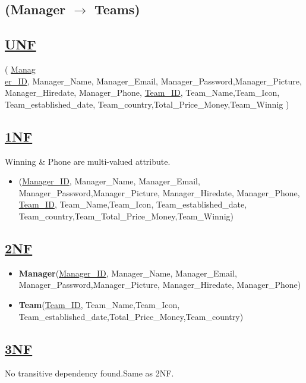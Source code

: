 \subsection{\texorpdfstring{\centering (Manager $\rightarrow$ Teams)}{ (Manager - Teams)}}

\subsection*{\underline{UNF}}

(
\underline{Manag\\er\_ID}, Manager\_Name, Manager\_Email, Manager\_Password,Manager\_Picture, Manager\_Hiredate, Manager\_Phone,
\underline{Team\_ID}, Team\_Name,Team\_Icon, Team\_established\_date, Team\_country,Total\_Price\_Money,Team\_Winnig
)

\subsection*{\underline{1NF}}

Winning \& Phone are multi-valued attribute.
\vskip 0.2in
\begin{itemize}
    \item
          (\underline{Manager\_ID}, Manager\_Name, Manager\_Email, Manager\_Password,Manager\_Picture, Manager\_Hiredate, Manager\_Phone,
          \underline{Team\_ID}, Team\_Name,Team\_Icon, Team\_established\_date, Team\_country,Team\_Total\_Price\_Money,Team\_Winnig)
\end{itemize}

\subsection*{\underline{2NF}}
\begin{itemize}
    \item \textbf{Manager}(\underline{Manager\_ID}, Manager\_Name, Manager\_Email, Manager\_Password,Manager\_Picture, Manager\_Hiredate, Manager\_Phone)
    \item \textbf{Team}(\underline{Team\_ID}, Team\_Name,Team\_Icon, Team\_established\_date,Total\_Price\_Money,Team\_country)
\end{itemize}

\subsection*{\underline{3NF}}
No transitive dependency found.Same as 2NF.

